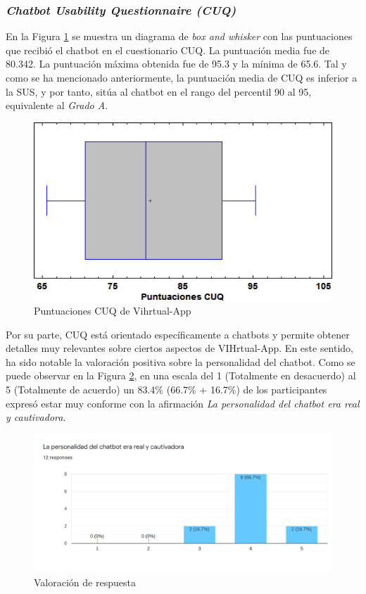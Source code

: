 \subsubsection{\textit{Chatbot Usability Questionnaire (CUQ)}}
En la Figura \ref{fig:cuqplot} se muestra un diagrama de \textit{box and whisker} con las puntuaciones que recibió el chatbot en el cuestionario CUQ. La puntuación media fue de 80.342. La puntuación máxima obtenida fue de 95.3 y la mínima de 65.6. Tal y como se ha mencionado anteriormente, la puntuación media de CUQ es inferior a la SUS, y por tanto, sitúa al chatbot en el rango del percentil 90 al 95, equivalente al \textit{Grado A}.

\begin{figure}[htbp]
\centering
\includegraphics[scale=0.8]{../images/cuq.png}
\caption{Puntuaciones CUQ de Vihrtual-App}
\label{fig:cuqplot}
\end{figure}


Por su parte, CUQ está orientado específicamente a chatbots y permite obtener detalles muy relevantes sobre ciertos aspectos de VIHrtual-App. En este sentido, ha sido notable la valoración positiva sobre la personalidad del chatbot. Como se puede observar en la Figura \ref{fig:encuesta}, en una escala del 1 (Totalmente en desacuerdo) al 5 (Totalmente de acuerdo) un 83.4\% (66.7\% + 16.7\%) de los participantes expresó estar muy conforme con la afirmación \textit{La personalidad del chatbot era real y cautivadora}.\\

\begin{figure}[htbp]
\centering
\includegraphics[scale=0.3]{../images/pregunta1.png}
\caption{Valoración de respuesta}
\label{fig:encuesta}
\end{figure}


